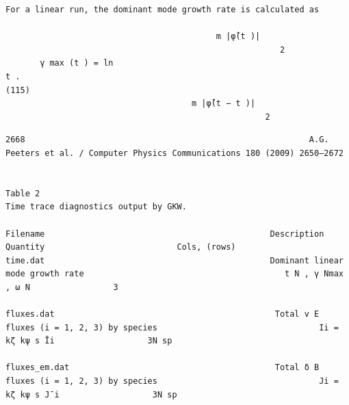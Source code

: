 \documentclass[a4paper]{article}
\newcommand{\gkwpagefont}{\fontsize{6.0pt}{7.55pt}\selectfont}
\begin{document}
\begin{Verbatim}[fontsize=\gkwpagefont]
For a linear run, the dominant mode growth rate is calculated as
                                                                 
                                           m |φ̂(t )|
                                                        2               
       γ max (t ) = ln                                                 t .                                                                (115)
                                      m |φ̂(t − t )|
                                                     2
\end{Verbatim}
\newpage
\begin{Verbatim}[fontsize=\gkwpagefont]
2668                                                          A.G. Peeters et al. / Computer Physics Communications 180 (2009) 2650–2672


Table 2
Time trace diagnostics output by GKW.

Filename                                              Description                                                              Quantity                           Cols, (rows)
time.dat                                              Dominant linear mode growth rate                                         t N , γ Nmax , ω N                 3
                                                                                                                                       
fluxes.dat                                             Total v E fluxes (i = 1, 2, 3) by species                                 Ii = kζ kψ s Īi                   3N sp
                                                                                                                                       
fluxes_em.dat                                          Total δ B fluxes (i = 1, 2, 3) by species                                 Ji = kζ kψ s J¯i                   3N sp
                                                                                                                                

\end{Verbatim}
\end{document}
